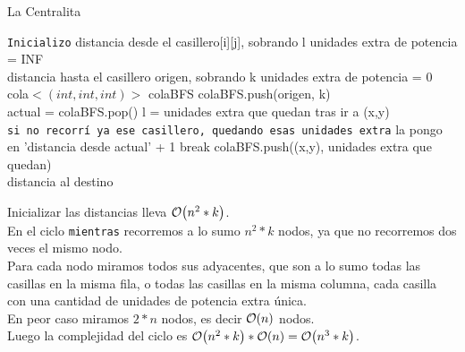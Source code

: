 \documentclass[11pt, a4paper, twoside]{article}
\begin{document}
{}

\begin{algorithm}[H]
\caption{La Centralita}
\begin{algorithmic}[1]

\Statex \texttt{Inicializo}
	  
		\State distancia desde el casillero[i][j], sobrando l unidades extra de potencia = INF
	\EndFor \\

\State distancia hasta el casillero origen, sobrando k unidades extra de potencia = 0 \\
\State cola$<(int, int, int)>$ colaBFS
\State colaBFS.push(origen, k) \\

   
\State actual = colaBFS.pop()
		    \State l = unidades extra que quedan tras ir a (x,y) \\
			\Statex \hspace{1cm} \texttt{si no recorrí ya ese casillero, quedando esas unidades extra}
				\State   la pongo en 'distancia desde actual' + 1
					\State break
				\EndIf
				\State colaBFS.push((x,y), unidades extra que quedan)
			\EndIf	
	\EndFor		
\EndWhile
\\
\State \Return distancia al destino

\end{algorithmic}
\end{algorithm}

Inicializar las distancias lleva $\mathop{}\mathopen{}\mathcal{O}\mathopen{}\left(n^2 * k\right)$.\\
En el ciclo \texttt{mientras} recorremos a lo sumo $n^2 * k$ nodos, ya que no recorremos dos veces el mismo nodo.\\
Para cada nodo miramos todos sus adyacentes, que son a lo sumo todas las casillas en la misma fila, o todas
las casillas en la misma columna, cada casilla con una cantidad de unidades de potencia extra única. \\
En peor caso miramos $2*n$ nodos, es decir $\mathop{}\mathopen{}\mathcal{O}\mathopen{}\left(n\right)$ nodos.\\
Luego la complejidad del ciclo es $\mathop{}\mathopen{}\mathcal{O}\mathopen{}\left(n^2 * k\right) * \mathop{}\mathopen{}\mathcal{O}\mathopen{}\left(n\right) = \mathop{}\mathopen{}\mathcal{O}\mathopen{}\left(n^3 * k\right)$.\\
\end{document}
